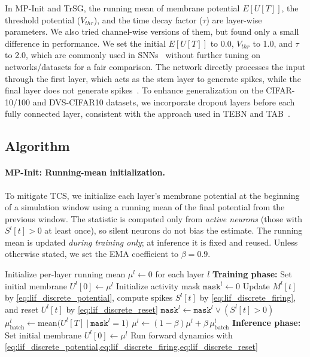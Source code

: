 In MP-Init and TrSG, the running mean of membrane potential \(E[U[T]]\), the threshold potential (\(V_{thr}\)), and the time decay factor (\(\tau\)) are layer-wise parameters. We also tried channel-wise versions of them, but found only a small difference in performance. We set the initial \(E[U[T]]\) to 0.0, \(V_{thr}\) to 1.0, and \(\tau\) to 2.0, which are commonly used in SNNs~\cite{deng:2022,tebn:2022,fang:2021_2,fang:2021,meng:2023,shen:2024,zhou:2024_2,shi:2024} without further tuning on networks/datasets for a fair comparison. The network directly processes the input through the first layer, which acts as the stem layer to generate spikes, while the final layer does not generate spikes~\cite{deng:2022}. To enhance generalization on the CIFAR-10/100 and DVS-CIFAR10 datasets, we incorporate dropout layers before each fully connected layer, consistent with the approach used in TEBN and TAB~\cite{tebn:2022,tab:2024}.

\subsection{Algorithm}
\label{sec:algorithm}

\paragraph{MP-Init: Running-mean initialization.}
To mitigate TCS, we initialize each layer’s membrane potential at the beginning of a simulation window using a running mean of the final potential from the previous window. The statistic is computed only from \emph{active neurons} (those with $S^{l}[t]>0$ at least once), so silent neurons do not bias the estimate. The running mean is updated \emph{during training only}; at inference it is fixed and reused. Unless otherwise stated, we set the EMA coefficient to $\beta=0.9$.

\begin{algorithm}[h]
\caption{MP-Init (per-layer initialization)}
\label{alg:mpinit}
\begin{algorithmic}[1]
\STATE Initialize per-layer running mean $\mu^{l}\!\leftarrow\!0$ for each layer $l$
\STATE \textbf{Training phase:}
  \STATE Set initial membrane $U^{l}[0] \leftarrow \mu^{l}$
  \STATE Initialize activity mask $\texttt{mask}^{l}\leftarrow 0$
    \STATE Update $M^{l}[t]$ by \cref{eq:lif_discrete_potential}, compute spikes $S^{l}[t]$ by \cref{eq:lif_discrete_firing}, and reset $U^{l}[t]$ by \cref{eq:lif_discrete_reset}
    \STATE $\texttt{mask}^{l} \leftarrow \texttt{mask}^{l} \lor (S^{l}[t] > 0)$
  \ENDFOR
  \STATE $\mu_{\text{batch}}^{l} \leftarrow \mathrm{mean}\!\big(U^{l}[T]\ \big|\ \texttt{mask}^{l}{=}1\big)$
  \STATE $\mu^{l} \leftarrow (1-\beta)\mu^{l} + \beta\,\mu_{\text{batch}}^{l}$
\ENDFOR
\STATE
\STATE \textbf{Inference phase:}
\STATE Set initial membrane $U^{l}[0] \leftarrow \mu^{l}$
\STATE Run forward dynamics with \cref{eq:lif_discrete_potential,eq:lif_discrete_firing,eq:lif_discrete_reset}
\end{algorithmic}
\end{algorithm}


